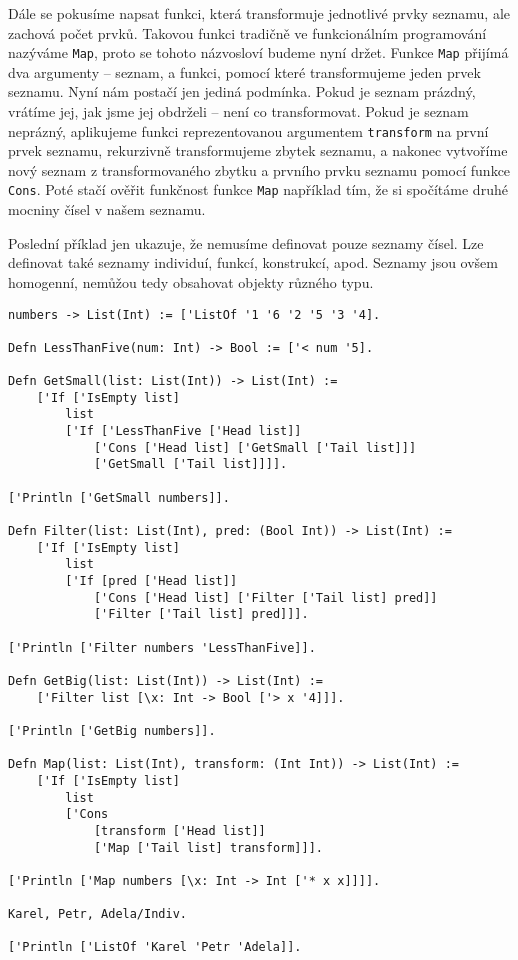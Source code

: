 Dále se pokusíme napsat funkci, která transformuje jednotlivé prvky seznamu, ale zachová počet
prvků. Takovou funkci tradičně ve funkcionálním programování nazýváme \lstinline{Map}, proto se
tohoto názvosloví budeme nyní držet. Funkce \lstinline{Map} přijímá dva argumenty -- seznam, a
funkci, pomocí které transformujeme jeden prvek seznamu. Nyní nám postačí jen jediná podmínka.
Pokud je seznam prázdný, vrátíme jej, jak jsme jej obdrželi -- není co transformovat. Pokud je seznam
neprázný, aplikujeme funkci reprezentovanou argumentem \lstinline{transform} na první prvek
seznamu, rekurzivně transformujeme zbytek seznamu, a nakonec vytvoříme nový seznam
z transformovaného zbytku a prvního prvku seznamu pomocí funkce \lstinline{Cons}. Poté stačí ověřit
funkčnost funkce \lstinline{Map} například tím, že si spočítáme druhé mocniny čísel v našem seznamu.

Poslední příklad jen ukazuje, že nemusíme definovat pouze seznamy čísel. Lze definovat také seznamy
individuí, funkcí, konstrukcí, apod. Seznamy jsou ovšem homogenní, nemůžou tedy obsahovat objekty
různého typu.

\begin{lstlisting}[caption={Funkce a uzávěry}]
numbers -> List(Int) := ['ListOf '1 '6 '2 '5 '3 '4].

Defn LessThanFive(num: Int) -> Bool := ['< num '5].

Defn GetSmall(list: List(Int)) -> List(Int) :=
    ['If ['IsEmpty list]
        list
        ['If ['LessThanFive ['Head list]]
            ['Cons ['Head list] ['GetSmall ['Tail list]]]
            ['GetSmall ['Tail list]]]].

['Println ['GetSmall numbers]].

Defn Filter(list: List(Int), pred: (Bool Int)) -> List(Int) :=
    ['If ['IsEmpty list]
        list
        ['If [pred ['Head list]]
            ['Cons ['Head list] ['Filter ['Tail list] pred]]
            ['Filter ['Tail list] pred]]].

['Println ['Filter numbers 'LessThanFive]].

Defn GetBig(list: List(Int)) -> List(Int) :=
    ['Filter list [\x: Int -> Bool ['> x '4]]].

['Println ['GetBig numbers]].

Defn Map(list: List(Int), transform: (Int Int)) -> List(Int) :=
    ['If ['IsEmpty list]
        list
        ['Cons
            [transform ['Head list]]
            ['Map ['Tail list] transform]]].

['Println ['Map numbers [\x: Int -> Int ['* x x]]]].

Karel, Petr, Adela/Indiv.

['Println ['ListOf 'Karel 'Petr 'Adela]].
\end{lstlisting}

